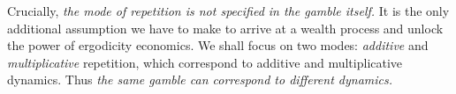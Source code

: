 %
%

Crucially, {\it the mode of repetition is not specified in the gamble itself.} It is the only
additional assumption we have to make to arrive at a wealth process and unlock the 
power of ergodicity economics. We shall 
focus on two modes: \textit{additive} and \textit{multiplicative} repetition, which
correspond to additive and multiplicative dynamics. Thus {\it the same gamble can 
correspond to different dynamics.}


